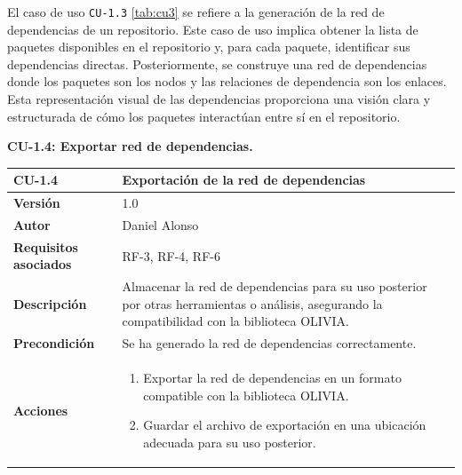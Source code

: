 El caso de uso \texttt{CU-1.3} \ref{tab:cu3} se refiere a la generación de la red de dependencias de un repositorio. Este caso de uso
implica obtener la lista de paquetes disponibles en el repositorio y, para cada paquete, identificar sus
dependencias directas. Posteriormente, se construye una red de dependencias donde los paquetes son los nodos
y las relaciones de dependencia son los enlaces. Esta representación visual de las dependencias proporciona
una visión clara y estructurada de cómo los paquetes interactúan entre sí en el repositorio.



\textbf{CU-1.4: Exportar red de dependencias.}

\begin{table}[p]
	\centering
	\begin{tabularx}{\linewidth}{ p{} p{} }
		\toprule
		\textbf{CU-1.4}               & \textbf{Exportación de la red de dependencias}                                                                                                   \\
		\toprule
		\textbf{Versión}              & 1.0                                                                                                                                              \\
		\textbf{Autor}                & Daniel Alonso                                                                                                                                    \\
		\textbf{Requisitos asociados} & RF-3, RF-4, RF-6                                                                                                                                 \\
		\textbf{Descripción}          & Almacenar la red de dependencias para su uso posterior por otras herramientas o análisis, asegurando la compatibilidad con la biblioteca OLIVIA. \\
		\textbf{Precondición}         & Se ha generado la red de dependencias correctamente.                                                                                             \\
		\textbf{Acciones}             &
		\begin{enumerate}
			\def\labelenumi{\arabic{enumi}.}
			\tightlist
			\item Exportar la red de dependencias en un formato compatible con la biblioteca OLIVIA.
			\item Guardar el archivo de exportación en una ubicación adecuada para su uso posterior.

\end{enumerate}
\end{tabularx}
\end{table}
